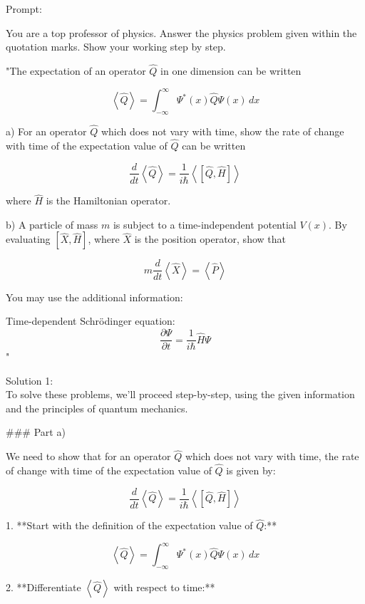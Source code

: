 \documentclass[a4paper,11pt]{article}
\begin{document}
Prompt:
\begin{spverbatim}
    You are a top professor of physics. Answer the physics problem given within the quotation marks. Show your working step by step.

    "The expectation of an operator \( \hat{Q} \) in one dimension can be written 

    \[ \left< \hat{Q} \right> = \int_{-\infty}^{\infty} \Psi^{*}(x) \hat{Q} \Psi(x) \, dx \]

    a) For an operator \( \hat{Q} \) which does not vary with time, show the rate of change with time of the expectation value of \( \hat{Q} \) can be written

    \[ \frac{d}{dt}\left<\hat{Q}\right> = \frac{1}{i\hbar}\left< \left[ \hat{Q}, \hat{H} \right] \right> \]

    where \( \hat{H} \) is the Hamiltonian operator. 

    b) A particle of mass \( m \) is subject to a time-independent potential \( V(x) \). By evaluating \( \left[ \hat{X}, \hat{H}\right] \), where \( \hat{X} \) is the position operator, show that 

    \[ m\frac{d}{dt}\left<\hat{X}\right> = \left<\hat{P}\right> \]

    You may use the additional information: 

    Time-dependent Schrödinger equation: 
    \[ \frac{\partial\Psi}{\partial t} = \frac{1}{i\hbar}\hat{H}\Psi \]"
\end{spverbatim}

\bigskip

\noindent Solution 1: \\

To solve these problems, we'll proceed step-by-step, using the given information and the principles of quantum mechanics.

### Part a)

We need to show that for an operator \( \hat{Q} \) which does not vary with time, the rate of change with time of the expectation value of \( \hat{Q} \) is given by:

\[ \frac{d}{dt}\left<\hat{Q}\right> = \frac{1}{i\hbar}\left< \left[ \hat{Q}, \hat{H} \right] \right> \]

1. **Start with the definition of the expectation value of \( \hat{Q} \):**

\[ \left< \hat{Q} \right> = \int_{-\infty}^{\infty} \Psi^{*}(x) \hat{Q} \Psi(x) \, dx \]

2. **Differentiate \( \left< \hat{Q} \right> \) with respect to time:**
\end{document}
